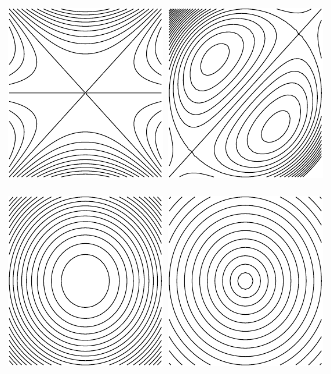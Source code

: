 \begin{question}[M200 2010A]
\begin{center}
  \includegraphics[width=0.308\textwidth, height=0.28\textwidth]{fig/level3.pdf}
\quad
  \includegraphics[width=0.308\textwidth, height=0.28\textwidth]{fig/level1.pdf}
\end{center}
\begin{center}
  \includegraphics[width=0.308\textwidth, height=0.28\textwidth]{fig/level4.pdf}
\quad
  \includegraphics[width=0.308\textwidth, height=0.28\textwidth]{fig/level2.pdf}
\end{center}
\end{question}

%

